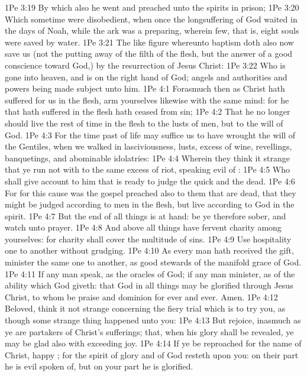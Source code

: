 \vs 1Pe 3:19 By which also he went and preached unto the spirits in prison;
\vs 1Pe 3:20 Which sometime were disobedient, when once the longsuffering of God waited in the days of Noah, while the ark was a preparing, wherein few, that is, eight souls were saved by water.
\vs 1Pe 3:21 The like figure whereunto  baptism doth also now save us (not the putting away of the filth of the flesh, but the answer of a good conscience toward God,) by the resurrection of Jesus Christ:
\vs 1Pe 3:22 Who is gone into heaven, and is on the right hand of God; angels and authorities and powers being made subject unto him.
\vs 1Pe 4:1 Forasmuch then as Christ hath suffered for us in the flesh, arm yourselves likewise with the same mind: for he that hath suffered in the flesh hath ceased from sin;
\vs 1Pe 4:2 That he no longer should live the rest of  time in the flesh to the lusts of men, but to the will of God.
\vs 1Pe 4:3 For the time past of  life may suffice us to have wrought the will of the Gentiles, when we walked in lasciviousness, lusts, excess of wine, revellings, banquetings, and abominable idolatries:
\vs 1Pe 4:4 Wherein they think it strange that ye run not with  to the same excess of riot, speaking evil of :
\vs 1Pe 4:5 Who shall give account to him that is ready to judge the quick and the dead.
\vs 1Pe 4:6 For for this cause was the gospel preached also to them that are dead, that they might be judged according to men in the flesh, but live according to God in the spirit.
\vs 1Pe 4:7 But the end of all things is at hand: be ye therefore sober, and watch unto prayer.
\vs 1Pe 4:8 And above all things have fervent charity among yourselves: for charity shall cover the multitude of sins.
\vs 1Pe 4:9 Use hospitality one to another without grudging.
\vs 1Pe 4:10 As every man hath received the gift,  minister the same one to another, as good stewards of the manifold grace of God.
\vs 1Pe 4:11 If any man speak,  as the oracles of God; if any man minister,  as of the ability which God giveth: that God in all things may be glorified through Jesus Christ, to whom be praise and dominion for ever and ever. Amen.
\vs 1Pe 4:12 Beloved, think it not strange concerning the fiery trial which is to try you, as though some strange thing happened unto you:
\vs 1Pe 4:13 But rejoice, inasmuch as ye are partakers of Christ's sufferings; that, when his glory shall be revealed, ye may be glad also with exceeding joy.
\vs 1Pe 4:14 If ye be reproached for the name of Christ, happy ; for the spirit of glory and of God resteth upon you: on their part he is evil spoken of, but on your part he is glorified.
